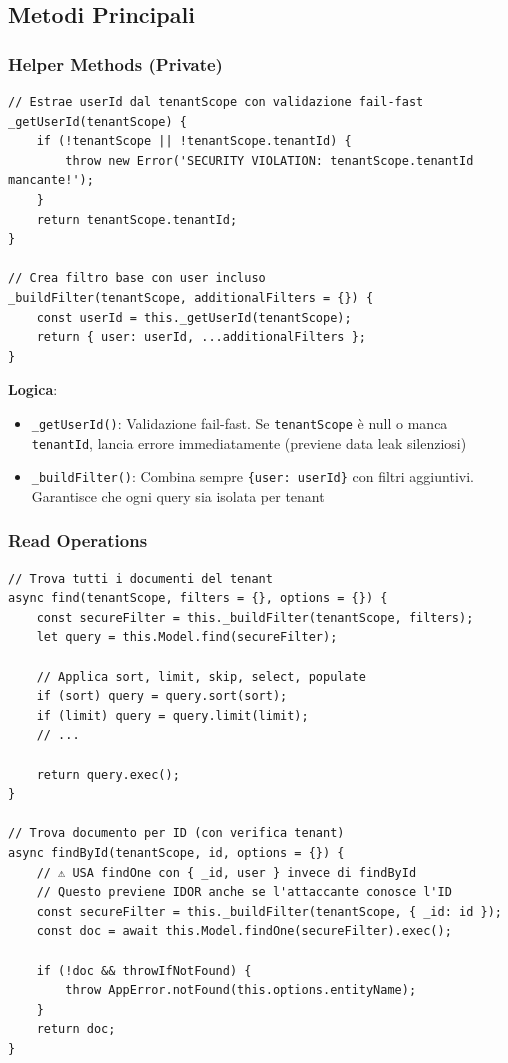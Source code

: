 \documentclass[11pt,a4paper]{article}
\begin{document}
\subsection{Metodi Principali}

\subsubsection{Helper Methods (Private)}

\begin{lstlisting}
// Estrae userId dal tenantScope con validazione fail-fast
_getUserId(tenantScope) {
    if (!tenantScope || !tenantScope.tenantId) {
        throw new Error('SECURITY VIOLATION: tenantScope.tenantId mancante!');
    }
    return tenantScope.tenantId;
}

// Crea filtro base con user incluso
_buildFilter(tenantScope, additionalFilters = {}) {
    const userId = this._getUserId(tenantScope);
    return { user: userId, ...additionalFilters };
}
\end{lstlisting}

\textbf{Logica}: 
\begin{itemize}
    \item \texttt{\_getUserId()}: Validazione fail-fast. Se \texttt{tenantScope} è null o manca \texttt{tenantId}, lancia errore immediatamente (previene data leak silenziosi)
    \item \texttt{\_buildFilter()}: Combina sempre \texttt{\{user: userId\}} con filtri aggiuntivi. Garantisce che ogni query sia isolata per tenant
\end{itemize}

\subsubsection{Read Operations}

\begin{lstlisting}
// Trova tutti i documenti del tenant
async find(tenantScope, filters = {}, options = {}) {
    const secureFilter = this._buildFilter(tenantScope, filters);
    let query = this.Model.find(secureFilter);
    
    // Applica sort, limit, skip, select, populate
    if (sort) query = query.sort(sort);
    if (limit) query = query.limit(limit);
    // ...
    
    return query.exec();
}

// Trova documento per ID (con verifica tenant)
async findById(tenantScope, id, options = {}) {
    // ⚠️ USA findOne con { _id, user } invece di findById
    // Questo previene IDOR anche se l'attaccante conosce l'ID
    const secureFilter = this._buildFilter(tenantScope, { _id: id });
    const doc = await this.Model.findOne(secureFilter).exec();
    
    if (!doc && throwIfNotFound) {
        throw AppError.notFound(this.options.entityName);
    }
    return doc;
}
\end{lstlisting}
\end{document}
